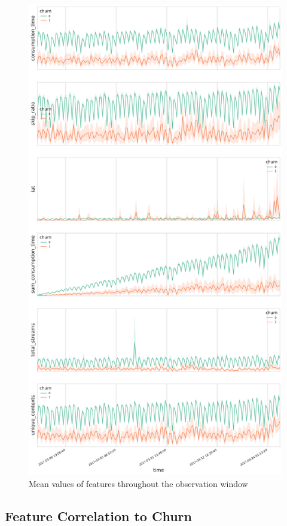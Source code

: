\documentclass{kththesis}
\begin{document}
	\begin{figure}[h]
    \centering
    \includegraphics[width=1.0\textwidth,height=1.0\textheight,keepaspectratio]{figures/feats_time.pdf}
    \caption{Mean values of features throughout the observation window}
    \label{fig:featstime}
	\end{figure}

\subsection{Feature Correlation to Churn}
\end{document}
